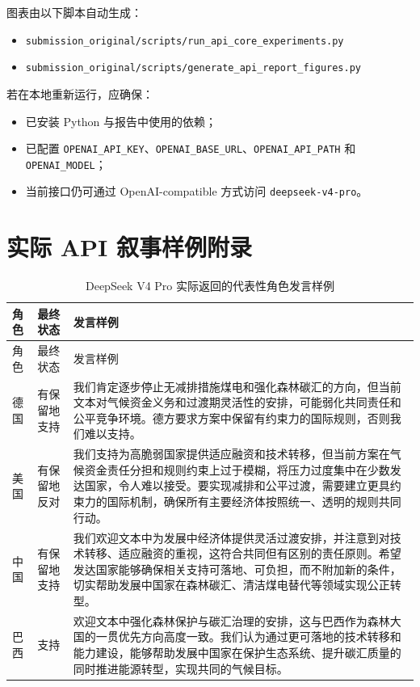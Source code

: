 \documentclass[12pt,a4paper]{ctexart}
\begin{document}
图表由以下脚本自动生成：
\begin{itemize}
  \item \texttt{submission\_original/scripts/run\_api\_core\_experiments.py}
  \item \texttt{submission\_original/scripts/generate\_api\_report\_figures.py}
\end{itemize}

若在本地重新运行，应确保：
\begin{itemize}
  \item 已安装 Python 与报告中使用的依赖；
  \item 已配置 \texttt{OPENAI\_API\_KEY}、\texttt{OPENAI\_BASE\_URL}、\texttt{OPENAI\_API\_PATH} 和 \texttt{OPENAI\_MODEL}；
  \item 当前接口仍可通过 OpenAI-compatible 方式访问 \texttt{deepseek-v4-pro}。
\end{itemize}

\section{实际 API 叙事样例附录}
\begin{longtable}{>{\raggedright\arraybackslash}p{1.8cm} >{\raggedright\arraybackslash}p{2.2cm} >{\raggedright\arraybackslash}p{10cm}}
\caption{DeepSeek V4 Pro 实际返回的代表性角色发言样例}\label{tab:llm-samples}\\
\toprule
角色 & 最终状态 & 发言样例 \\
\midrule
\endfirsthead
\toprule
角色 & 最终状态 & 发言样例 \\
\midrule
\endhead
德国 & 有保留地支持 & 我们肯定逐步停止无减排措施煤电和强化森林碳汇的方向，但当前文本对气候资金义务和过渡期灵活性的安排，可能弱化共同责任和公平竞争环境。德方要求方案中保留有约束力的国际规则，否则我们难以支持。 \\
美国 & 有保留地反对 & 我们支持为高脆弱国家提供适应融资和技术转移，但当前方案在气候资金责任分担和规则约束上过于模糊，将压力过度集中在少数发达国家，令人难以接受。要实现减排和公平过渡，需要建立更具约束力的国际机制，确保所有主要经济体按照统一、透明的规则共同行动。 \\
中国 & 有保留地支持 & 我们欢迎文本中为发展中经济体提供灵活过渡安排，并注意到对技术转移、适应融资的重视，这符合共同但有区别的责任原则。希望发达国家能够确保相关支持可落地、可负担，而不附加新的条件，切实帮助发展中国家在森林碳汇、清洁煤电替代等领域实现公正转型。 \\
巴西 & 支持 & 欢迎文本中强化森林保护与碳汇治理的安排，这与巴西作为森林大国的一贯优先方向高度一致。我们认为通过更可落地的技术转移和能力建设，能够帮助发展中国家在保护生态系统、提升碳汇质量的同时推进能源转型，实现共同的气候目标。 \\
\bottomrule
\end{longtable}
\end{document}
